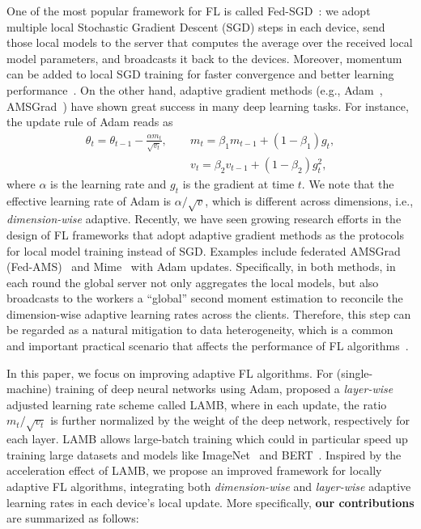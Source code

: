 \documentclass[nohyperref]{article}
\theoremstyle{plain}
\theoremstyle{definition}
\theoremstyle{remark}
\begin{document}
One of the most popular framework for FL is called Fed-SGD~\citep{mcmahan2017communication}: we adopt multiple local Stochastic Gradient Descent (SGD) steps in each device, send those local models to the server that computes the average over the received local model parameters, and broadcasts it back to the devices. Moreover, momentum can be added to local SGD training for faster convergence and better learning performance~\citep{Proc:YuJY_ICML19}. On the other hand, adaptive gradient methods (e.g., Adam~\citep{KB15}, AMSGrad~\cite{reddi2019convergence}) have shown great success in many deep learning tasks. For instance, the update rule of Adam reads as
\begin{equation}\label{rule:adam}
    \begin{aligned}
       \theta_t=\theta_{t-1}-\frac{\alpha m_t}{\sqrt{v_t}},\ \quad &m_t=\beta_1 m_{t-1}+(1-\beta_1) g_t,\\
       & v_t=\beta_2 v_{t-1}+(1-\beta_2) g_t^2,
    \end{aligned}
\end{equation}
where $\alpha$ is the learning rate and $g_t$ is the gradient at time $t$. 
We note that the effective learning rate of Adam is $\alpha/\sqrt{v}$, which is different across dimensions, i.e., \textit{dimension-wise} adaptive. Recently, we have seen growing research efforts in the design of FL frameworks that adopt adaptive gradient methods as the protocols for local model training instead of SGD. 
Examples include federated AMSGrad (Fed-AMS)~\cite{chen2020toward} and Mime~\cite{karimireddy2020mime} with Adam updates. 
Specifically, in both methods, in each round the global server not only aggregates the local models, but also broadcasts to the workers a ``global'' second moment estimation to reconcile the dimension-wise adaptive learning rates across the clients. Therefore, this step can be regarded as a natural mitigation to data heterogeneity, which is a common and important practical scenario that affects the performance of FL algorithms~\citep{li2019federated,liang2019variance,karimireddy2019scaffold}.

In this paper, we focus on improving adaptive FL algorithms. For (single-machine) training of deep neural networks using Adam, \citet{you2019large} proposed a \textit{layer-wise} adjusted learning rate scheme called LAMB, where in each update, the ratio $m_t/\sqrt{v_t}$ is further normalized by the weight of the deep network, respectively for each layer. 
LAMB allows large-batch training which could in particular speed up training large datasets and models like ImageNet~\cite{deng2009imagenet} and BERT~\cite{bert19}. Inspired by the acceleration effect of LAMB, we propose an improved framework for locally adaptive FL algorithms, integrating both \emph{dimension-wise} and \emph{layer-wise} adaptive learning rates in each device's local update. More specifically, \textbf{our contributions} are summarized as follows:
\end{document}
